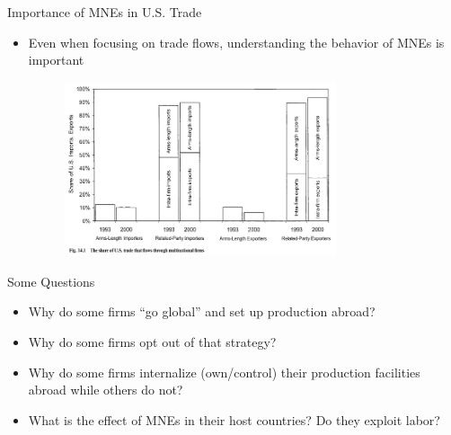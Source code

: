 \documentclass[10pt,hyperref={CJKbookmarks=true},xcolor=dvipsnames,aspectratio=169]{beamer}
\begin{document}
\begin{frame}{Importance of MNEs in U.S. Trade}

\begin{itemize}
\item Even when focusing on trade flows, understanding the behavior of MNEs
is important
\begin{figure}


\begin{centering}
\includegraphics[width=8cm]{fig/fdi/lec7-3}
\par\end{centering}

\end{figure}

\end{itemize}

\end{frame}

\begin{frame}{Some Questions}

\begin{itemize}
\item Why do some firms “go global” and set up production abroad? 
\item Why do some firms opt out of that strategy? 
\item Why do some firms internalize (own/control) their production facilities
abroad while others do not? 
\item What is the effect of MNEs in their host countries? Do they exploit
labor?
\end{itemize}
\end{frame}
\end{document}
